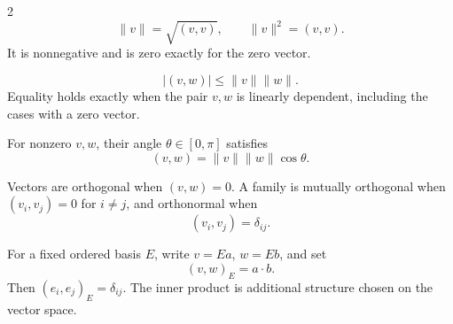 \begin{fullwidth}
\begin{multicols}{2}
    \[
      \lVert v\rVert=\sqrt{(v,v)},\qquad
      \lVert v\rVert^2=(v,v).
    \]
    It is nonnegative and is zero exactly for the zero vector.

    \[
      \lvert(v,w)\rvert\le\lVert v\rVert\lVert w\rVert.
    \]
    Equality holds exactly when the pair \(v,w\) is linearly dependent,
    including the cases with a zero vector.

    For nonzero \(v,w\), their angle \(\theta\in[0,\pi]\) satisfies
    \[
      (v,w)=\lVert v\rVert\lVert w\rVert\cos\theta.
    \]

    Vectors are orthogonal when \((v,w)=0\). A family is mutually
    orthogonal when \((v_i,v_j)=0\) for \(i\ne j\), and orthonormal when
    \[
      (v_i,v_j)=\delta_{ij}.
    \]

    For a fixed ordered basis \(E\), write \(v=Ea\), \(w=Eb\), and set
    \[
      (v,w)_E=a\cdot b.
    \]
    Then \((e_i,e_j)_E=\delta_{ij}\). The inner product is additional
    structure chosen on the vector space.
  \end{multicols}
\end{fullwidth}
\endgroup

